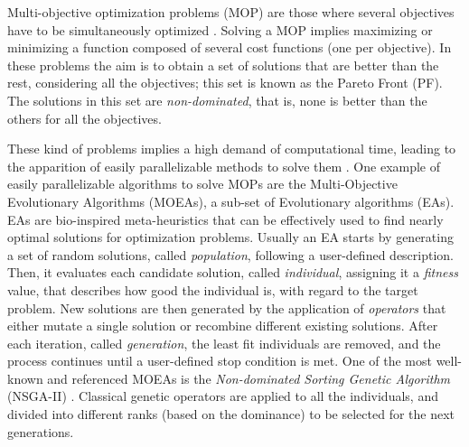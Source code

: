 \documentclass[preprint]{elsarticle}
\begin{document}

Multi-objective optimization problems (MOP) are those where several
objectives have to be simultaneously optimized
\citep{Mora13paretobased,LIU2017344}. Solving a MOP implies maximizing or minimizing
a function composed of several cost functions (one per objective). In
these problems the aim is to obtain a set of solutions that are better
than the rest, considering all the objectives; this set is known as
the Pareto Front (PF). The solutions in this set are {\em non-dominated},
that is, none is better than the others for all the objectives.


These kind of problems implies a high demand of computational time, leading to the apparition of easily parallelizable methods to solve them \citep{Luna15Survey,Mukhopadhyay14Survey,Chavez15MO,Hidalgo16residualstress,KAUR2018183,XU2018268}.
One example of easily parallelizable algorithms to solve MOPs are the Multi-Objective Evolutionary Algorithms (MOEAs), a sub-set of Evolutionary algorithms (EAs). EAs \citep{DBLP:series/ncs/EibenS15} are bio-inspired meta-heuristics that can be effectively used to find nearly optimal solutions for optimization problems. Usually an EA starts by generating a set of random solutions, called \emph{population}, following a user-defined description. Then, it evaluates each candidate solution, called \emph{individual}, assigning it a \emph{fitness} value, that describes how good the individual is, with regard to the target problem. New solutions are then generated by the application of \emph{operators} that either mutate a single solution or recombine different existing solutions. After each iteration, called \emph{generation}, the least fit individuals are removed, and the process continues until a user-defined stop condition is met. One of the most well-known and referenced MOEAs \citep{Dorronsoro13superlinear} is the {\em
  Non-dominated Sorting Genetic Algorithm} (NSGA-II)
\citep{Deb00NSGAII}. Classical genetic operators are applied to all
the individuals, and divided into different ranks (based on the
dominance) to be selected for the next generations. 
\end{document}

